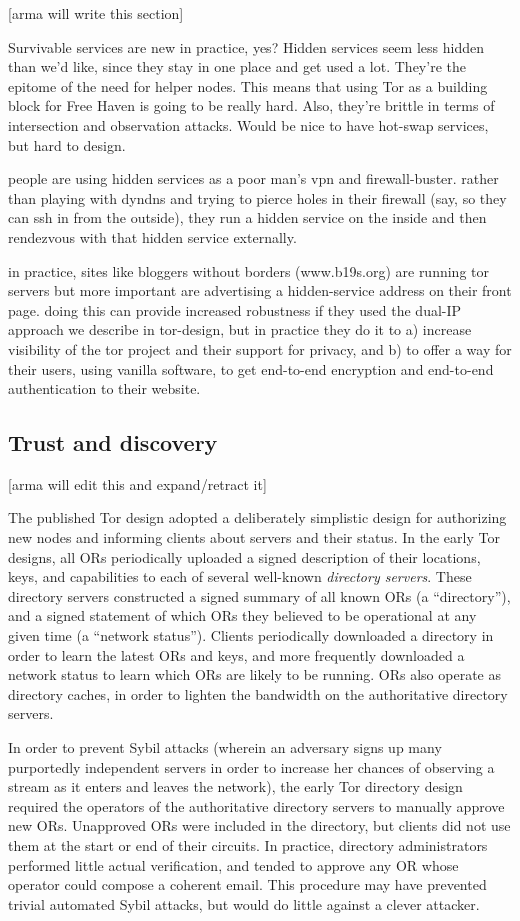 \documentclass{llncs}
\begin{document}
[arma will write this section]

Survivable services are new in practice, yes? Hidden services seem
less hidden than we'd like, since they stay in one place and get used
a lot. They're the epitome of the need for helper nodes. This means
that using Tor as a building block for Free Haven is going to be really
hard. Also, they're brittle in terms of intersection and observation
attacks. Would be nice to have hot-swap services, but hard to design.

people are using hidden services as a poor man's vpn and firewall-buster.
rather than playing with dyndns and trying to pierce holes in their
firewall (say, so they can ssh in from the outside), they run a hidden
service on the inside and then rendezvous with that hidden service
externally.

in practice, sites like bloggers without borders (www.b19s.org) are
running tor servers but more important are advertising a hidden-service
address on their front page. doing this can provide increased robustness
if they used the dual-IP approach we describe in tor-design, but in
practice they do it to a) increase visibility of the tor project and their
support for privacy, and b) to offer a way for their users, using vanilla
software, to get end-to-end encryption and end-to-end authentication to
their website.


\subsection{Trust and discovery}

[arma will edit this and expand/retract it]

The published Tor design adopted a deliberately simplistic design for
authorizing new nodes and informing clients about servers and their status.
In the early Tor designs, all ORs periodically uploaded a signed description
of their locations, keys, and capabilities to each of several well-known {\it
  directory servers}.  These directory servers constructed a signed summary
of all known ORs (a ``directory''), and a signed statement of which ORs they
believed to be operational at any given time (a ``network status'').  Clients
periodically downloaded a directory in order to learn the latest ORs and
keys, and more frequently downloaded a network status to learn which ORs are
likely to be running.  ORs also operate as directory caches, in order to
lighten the bandwidth on the authoritative directory servers.

In order to prevent Sybil attacks (wherein an adversary signs up many
purportedly independent servers in order to increase her chances of observing
a stream as it enters and leaves the network), the early Tor directory design
required the operators of the authoritative directory servers to manually
approve new ORs.  Unapproved ORs were included in the directory, but clients
did not use them at the start or end of their circuits.  In practice,
directory administrators performed little actual verification, and tended to
approve any OR whose operator could compose a coherent email.  This procedure
may have prevented trivial automated Sybil attacks, but would do little
against a clever attacker.
\end{document}
